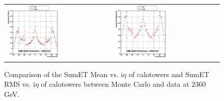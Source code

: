 \begin{figure}[h!]
 \centering
 \begin{tabular}{ll}
  \includegraphics[width=0.5\textwidth]{plots_DataVsMC_MB_2360GeV/g_caloSumetMean_vs_ieta_2360.eps} &
  \includegraphics[width=0.5\textwidth]{plots_DataVsMC_MB_2360GeV/g_caloSumetRMS_vs_ieta_2360.eps} \\
 \end{tabular}
 \caption{\small Comparison of the SumET Mean vs. i$\eta$ of calotowers and SumET RMS vs. i$\eta$ of calotowers between 
          Monte Carlo and data at $2360$ GeV.\label{fig:SumET_MeanRMS_vs_ieta_2360}}
\end{figure}

